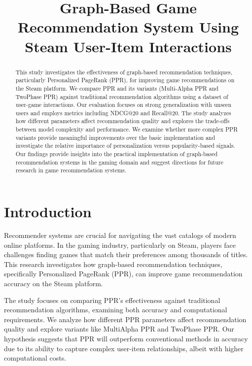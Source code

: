 \documentclass[conference,compsoc]{IEEEtran}
\begin{document}
\title{Graph-Based Game Recommendation System Using Steam User-Item Interactions}
\author{
}
\maketitle

\begin{abstract}
This study investigates the effectiveness of graph-based recommendation techniques, particularly Personalized PageRank (PPR), for improving game recommendations on the Steam platform. We compare PPR and its variants (Multi-Alpha PPR and TwoPhase PPR) against traditional recommendation algorithms using a dataset of user-game interactions. Our evaluation focuses on strong generalization with unseen users and employs metrics including NDCG@20 and Recall@20. The study analyzes how different parameters affect recommendation quality and explores the trade-offs between model complexity and performance. We examine whether more complex PPR variants provide meaningful improvements over the basic implementation and investigate the relative importance of personalization versus popularity-based signals. Our findings provide insights into the practical implementation of graph-based recommendation systems in the gaming domain and suggest directions for future research in game recommendation systems.
\end{abstract}

\section{Introduction}
Recommender systems are crucial for navigating the vast catalogs of modern online platforms. In the gaming industry, particularly on Steam, players face challenges finding games that match their preferences among thousands of titles. This research investigates how graph-based recommendation techniques, specifically Personalized PageRank (PPR), can improve game recommendation accuracy on the Steam platform.

The study focuses on comparing PPR's effectiveness against traditional recommendation algorithms, examining both accuracy and computational requirements. We analyze how different PPR parameters affect recommendation quality and explore variants like MultiAlpha PPR and TwoPhase PPR. Our hypothesis suggests that PPR will outperform conventional methods in accuracy due to its ability to capture complex user-item relationships, albeit with higher computational costs.
\end{document}

